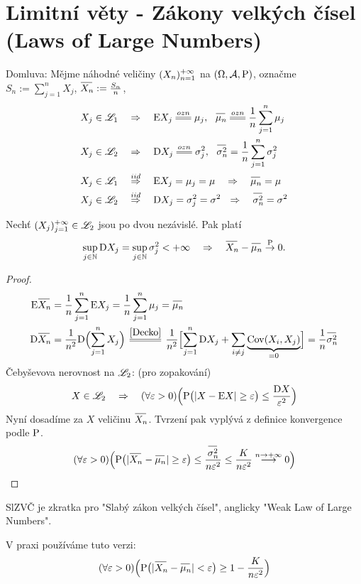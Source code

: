\chapter{Limitní věty - Zákony velkých čísel (Laws of Large Numbers)}
Domluva: Mějme náhodné veličiny $(X_n)_{n=1}^{+\infty}$ na $(\Omega,\mathcal{A},\mathrm{P})$, označme $S_n:=\sum\limits_{j=1}^n X_j$, $\oxn:=\frac{S_n}{n} $,
\[
\begin{split}
X_j\in\LL_1 &~~~\Rightarrow~~~ \E X_j\equal{ozn}\mu_j,~~\omn\equal{ozn}\frac{1}{n}\sum\limits_{j=1}^n \mu_j \\
X_j\in\LL_2 &~~~\Rightarrow~~~ \D X_j\equal{ozn}\sigma_j^2,~~\osn =\frac{1}{n}\sum\limits_{j=1}^n \sigma_j^2 \\
X_j\in\LL_1&\stackrel{iid}{~~~\Rightarrow~~~}\E X_j=\mu_j=\mu~~~\Rightarrow~~~\omn =\mu \\
X_j\in\LL_2&\stackrel{iid}{~~~\Rightarrow~~~}\D X_j=\sigma_j^2=\sigma^2~~\Rightarrow~~~\osn =\sigma^2
\end{split}
\] 
\begin{theorem}
	Nechť $(X_j)_{j=1}^{+\infty}\in\mathscr{L}_2$ jsou po dvou nezávislé. Pak platí
	$$\sup\limits_{j\in\N}\D X_j = \sup\limits_{j\in\N}\sigma_j^2<+\infty~~~\Rightarrow~~~\oxn  - \omn \Pto 0.$$\begin{proof}
		\[
		\begin{split}
		\E \oxn &=\frac{1}{n}\sum\limits_{j=1}^n \E X_j=\frac{1}{n}\sum\limits_{j=1}^n \mu_j=\omn  \\
		\D \oxn &=\frac{1}{n^2}\D \Bigl(\sum\limits_{j=1}^n X_j\Bigr)\equal{\ref{Decko}}\frac{1}{n^2}\Bigl[\sum\limits_{j=1}^n \D X_j+\sum\limits_{i\neq j}\underbrace{\Cov(X_i,X_j)}_{=0}\Bigr]=\frac{1}{n}\osn  
		\end{split}
		\]	
		Čebyševova nerovnost na $\mathscr{L}_2$: (pro zopakování)
		$$ X\in\mathscr{L}_2~~~\Rightarrow~~~
		(\forall\varepsilon>0)\Bigl( \mathrm{P}\bigl( |X-\mathrm{E} X|\geq\varepsilon \bigr)\leq \frac{\mathrm{D} X}{\varepsilon^2} \Bigr)	  $$
		Nyní dosadíme za $X$ veličinu $\oxn $. Tvrzení pak vyplývá z definice konvergence podle $\mathrm{P}$.
		$$	
		(\forall\epsilon>0)\Bigl( \PP\bigl( |\oxn -\omn |\geq\epsilon \bigr)\leq \frac{\osn }{n\epsilon^2}\leq \frac{K}{n\epsilon^2}\stackrel{n\to+\infty}{\longrightarrow}0 \Bigr)$$
	\end{proof}
\end{theorem}
\begin{remark}
	SlZVČ je zkratka pro "Slabý zákon velkých čísel", anglicky "Weak Law of Large Numbers".
\end{remark}
\begin{remark}
	V praxi používáme tuto verzi: $$ (\forall\epsilon>0)\Bigl( \PP\bigl(|\oxn-\omn|<\epsilon\bigr)\geq 1-\frac{K}{n\epsilon^2} \Bigr) $$
\end{remark}
